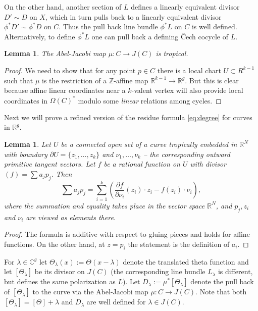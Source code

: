 \documentclass[12pt]{amsart}
\theoremstyle{plain}
\newtheorem{lemma}[theorem]{Lemma}
\theoremstyle{definition}
\theoremstyle{remark}
\newcommand{\Z}{\mathbb Z}    %
\newcommand{\R}{\mathbb R}    %
\newcommand{\C}{\mathbb C}    %
\newcommand{\<}{\langle}   %
\renewcommand{\>}{\rangle} %
\begin{document}
On the other hand, another section of $L$ defines a linearly equivalent divisor $D'\sim D$ on $X$, which in turn pulls back to a linearly equivalent divisor $\phi^* D'\sim \phi^* D$ on $C$. Thus the pull back line bundle $\phi^*L$ on $C$ is well defined. Alternatively, to define $\phi^*L$ one can pull back a defining \v{C}ech cocycle of $L$.

\begin{lemma}
The Abel-Jacobi map $\mu:C\to J(C)$ is tropical.
\end{lemma}
\begin{proof}
We need to show that for any point $p\in C$ there is a local chart $U\subset
R^{k-1}$ such that $\mu$ is the restriction of a $\Z$-affine map
$\R^{k-1}\to\R^g$. But this is clear because affine linear coordinates near a
$k$-valent vertex will also provide local coordinates in $\Omega(C)^*$ modulo
some {\em linear} relations among cycles.
\end{proof}

Next we will prove a refined version of the residue formula \eqref{eq:degree} for curves in
$\R^g$.

\begin{lemma}
Let $U$ be a connected open set of a curve tropically embedded in
$\R^N$ with boundary $\partial U =\{z_1,\dots,z_k\}$ and
$\nu_1,\dots,\nu_k$ -- the corresponding outward primitive tangent
vectors. Let $f$ be a rational function on $U$ with divisor $(f)=\sum
a_j p_j$. Then
\begin{equation}\label{eq:divisor}
\sum a_j p_j=\sum_{i=1}^k \left(\frac{\partial f}{\partial \nu_i}(z_i) \cdot
z_i-f(z_i) \cdot \nu_i \right),
\end{equation}
where the summation and equality takes place in the vector space $\R^N$, and
$p_j,z_i$ and $\nu_i$ are viewed as elements there.
\end{lemma}
\begin{proof}
The formula is additive with respect to gluing pieces and holds for affine
functions. On the other hand, at $z=p_i$ the statement is the definition of
$a_i$.
\end{proof}

For $\lambda\in \C^g$ let $\Theta_\lambda(x):=\Theta(x-\lambda)$ denote the translated theta function
and let $[\Theta_\lambda]$ be its divisor on $J(C)$ (the
corresponding line bundle $L_\lambda$ is different, but defines the same polarization as $L$).
 Let $D_\lambda:=\mu^*[\Theta_\lambda]$ denote the pull back of
$[\Theta_\lambda]$ to the curve via the Abel-Jacobi map $\mu:C\to J(C)$.
Note that both $[\Theta_\lambda]=[\Theta]+\lambda$ and $D_\lambda$ are well defined for $\lambda\in J(C)$.
\end{document}

